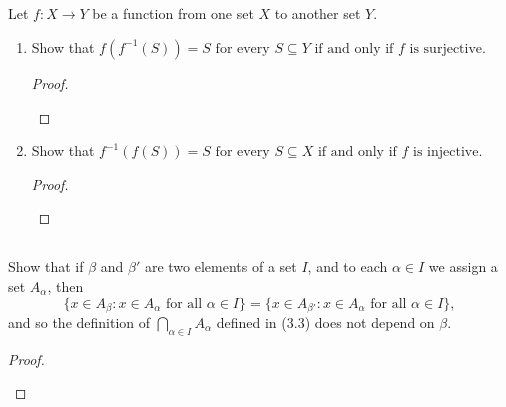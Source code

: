 \documentclass[../../main.tex]{subfiles}
\begin{document}
\subsection{}
\begin{q}
    Let $f \colon X \to Y$ be a function from one set $X$ to another set $Y$. 
    
    \begin{enumerate}
        \item
        Show that $f(f^{-1}(S)) = S \text{ for every } S \subseteq Y \text{ if and only if } f \text{ is surjective.}$
        \begin{proof}
            
            \begin{xx}
                
            \end{xx}
        \end{proof}

        \item 
        Show that \(f^{-1}(f(S)) = S \text{ for every } S \subseteq X \text{ if and only if } f \text{ is injective.}\)
        \begin{proof}
            
            \begin{xx}
                
            \end{xx}
        \end{proof}
    \end{enumerate}

\end{q}

\addtocounter{subsection}{3}
\subsection{}
\begin{q}
    Show that if $\beta$ and $\beta'$ are two elements of a set $I$, and to each $\alpha \in I$ we assign a set $A_\alpha$, then \[
        \{
            x \in A_\beta : x \in A_\alpha \text{ for all } \alpha \in I
        \} = 
        \{
            x \in A_{\beta'} : x \in A_\alpha \text{ for all } \alpha \in I
        \},
    \]
    and so the definition of $\bigcap_{\alpha \in I} A_\alpha$ defined in (3.3) does not depend on $\beta$. 
\end{q}

\begin{proof}
    
    \begin{xx}
        
    \end{xx}
\end{proof}
\end{document}
